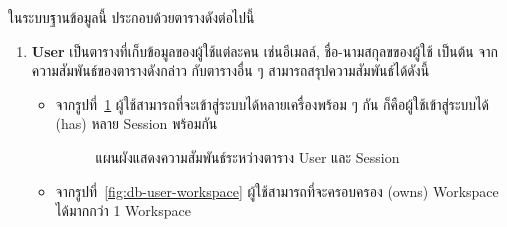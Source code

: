 \documentclass[12pt,oneside,openright,a4paper]{cpe-thai-project}
\begin{document}
    \pagebreak
    \begin{flushleft}
     ในระบบฐานข้อมูลนี้ ประกอบด้วยตารางดังต่อไปนี้
    \end{flushleft}
    \begin{enumerate}
        \item \textbf{User}
            เป็นตารางที่เก็บข้อมูลของผู้ใช้แต่ละคน เช่นอีเมลล์, ชื่อ-นามสกุลขของผู้ใช้ เป็นต้น จากความสัมพันธ์ของตารางดังกล่าว กับตารางอื่น ๆ สามารถสรุปความสัมพันธ์ได้ดังนี้
            \begin{itemize}
                \item จากรูปที่~\ref{fig:db-user-session} ผู้ใช้สามารถที่จะเข้าสู่ระบบได้หลายเครื่องพร้อม ๆ กัน ก็คือผู้ใช้เข้าสู่ระบบได้ (has) หลาย Session พร้อมกัน
                    \begin{figure}[H]
                        \centering 
                        \caption[แผนผังแสดงความสัมพันธ์ระหว่างตาราง User และ Session]{แผนผังแสดงความสัมพันธ์ระหว่างตาราง User และ Session}
                        \label{fig:db-user-session}
                    \end{figure}
                \item จากรูปที่~\ref{fig:db-user-workspace} ผู้ใช้สามารถที่จะครอบครอง (owns) Workspace ได้มากกว่า 1 Workspace
                    \begin{figure}[H]
                        \centering 
                        \begin{tikzpicture}[auto,node distance=1.5cm]

\end{tikzpicture}
\end{figure}
\end{itemize}
\end{enumerate}
\end{document}
